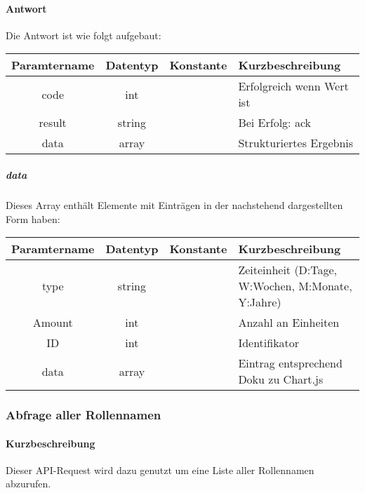 \paragraph{Antwort}Die Antwort ist wie folgt aufgebaut:
\begin{table}[H]
	\begin{tabular}{|c|c|c|p{6.5cm}|}
		\hline
		\textbf{Paramtername} & \textbf{Datentyp} & \textbf{Konstante} & \textbf{Kurzbeschreibung}            \\ \hline                
		code                & int              &                 & Erfolgreich wenn Wert {\glqq 0\grqq} ist \\ \hline
		result              & string           &                 & Bei Erfolg: {\glqq ack\grqq} \\ \hline
		data                & array            &                 & Strukturiertes Ergebnis \\ \hline
	\end{tabular}
\end{table}
\subparagraph{data}Dieses Array enthält Elemente mit Einträgen in der nachstehend dargestellten Form haben:
\begin{table}[H]
	\begin{tabular}{|c|c|c|p{6.5cm}|}
		\hline
		\textbf{Paramtername} & \textbf{Datentyp} & \textbf{Konstante} & \textbf{Kurzbeschreibung}    \\ \hline
		type               & string            &                 & Zeiteinheit (D:Tage, W:Wochen, M:Monate, Y:Jahre) \\ \hline
		Amount             & int               &                 & Anzahl an Einheiten \\ \hline
		ID                 & int               &                 & Identifikator \\ \hline
		data               & array             &                 & Eintrag entsprechend Doku zu Chart.js \\ \hline
	\end{tabular}
\end{table}
\subsubsection{Abfrage aller Rollennamen}
\paragraph{Kurzbeschreibung}Dieser API-Request wird dazu genutzt um eine Liste aller Rollennamen abzurufen.
